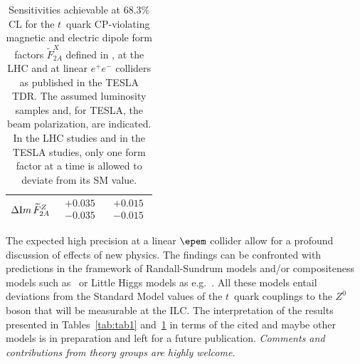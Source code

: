 \begin{table}[ht]
\begin{center}
\begin{footnotesize}
\begin{tabular}{|ccc|}
$\Delta {\mbox Im}\, \widetilde F_{2A}^{Z}$& $\begin{matrix} +0.035 \\[-4pt] -0.035\end{matrix}$ & $\begin{matrix} +0.015 \\[-4pt] -0.015\end{matrix}$ \\
\hline
\end{tabular}
\end{footnotesize}
\caption{Sensitivities achievable at $68.3\%$ CL for the $t$~quark
CP-violating magnetic and electric dipole
form factors 
$\widetilde F^X_{2A}$ defined in , at the  LHC and at 
linear $e^+e^-$ colliders as published in the TESLA TDR.  The assumed luminosity samples and, for TESLA, the beam polarization,
 are indicated. In the LHC studies and in the TESLA studies, only one form factor at a time is 
allowed to deviate from its SM value. } 
\label{tab:tab2}
\end{center}
\end{table}

The expected high precision at a linear $\epem$ collider allow for a profound discussion of effects of new physics. The findings can be confronted with predictions in the framework of Randall-Sundrum models and/or compositeness models such as~\cite{Pomarol:2008bh,Djouadi:2006rk,Hosotani:2005nz,Cui:2010ds,Carena:2006bn,Grojean:2013qca} or Little Higgs models as e.g.~\cite{Berger:2005ht}. All these models entail deviations from the Standard Model values of the $t$~quark couplings to the $Z^0$ boson that will be measurable at the ILC. The interpretation of the results presented in Tables~\ref{tab:tab1} and~\ref{tab:tab2} in terms of the cited and maybe other models is in preparation and left for a future publication. {\em Comments and contributions from theory groups are highly welcome.}



